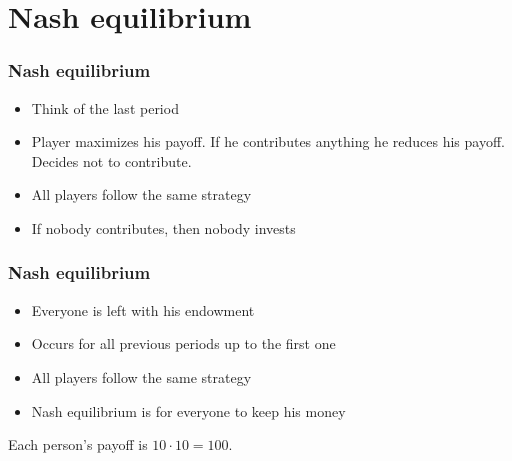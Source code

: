 \section{Nash equilibrium}

	\begin{frame}
		\frametitle{Nash equilibrium} 
		
		\begin{itemize}
			\item
				Think of the last period
			\item
				Player maximizes his payoff. 
				If he contributes anything he reduces his payoff.
				Decides not to contribute.
			\item
				All players follow the same strategy
			\item
				If nobody contributes, then nobody invests
		\end{itemize}
		
	\end{frame}
	
	\begin{frame}
		\frametitle{Nash equilibrium} 
		
		\begin{itemize}
			\item
				Everyone is left with his endowment
			\item
				Occurs for all previous periods up to the first one
			\item
				All players follow the same strategy
			\item
				Nash equilibrium is for everyone to keep his money
		\end{itemize}
		
		Each person's payoff is $10 \cdot 10 = 100$.
		
	\end{frame}